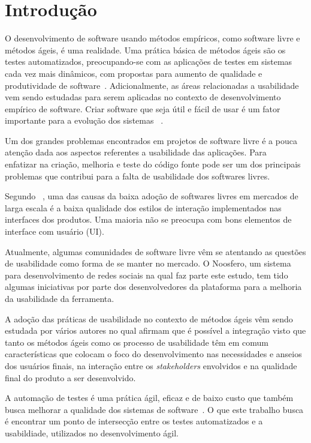 \chapter{Introdução}

O desenvolvimento de software usando métodos empíricos, como software livre e métodos ágeis, é uma realidade. Uma prática básica de métodos ágeis são os testes automatizados, preocupando-se com as aplicações de testes em sistemas cada vez mais dinâmicos, com propostas para aumento de qualidade e produtividade de software~\cite{vicente2010}.
%
Adicionalmente, as áreas relacionadas a usabilidade vem sendo estudadas para serem aplicadas no contexto de desenvolvimento empírico de software. Criar software que seja útil e fácil de usar é um fator importante para a evolução dos sistemas ~\cite{santos2012}.

Um dos grandes problemas encontrados em projetos de software livre é a pouca atenção dada aos aspectos referentes a usabilidade das aplicações. Para ~ enfatizar na criação, melhoria e teste do código fonte pode ser um dos principais problemas que contribui para a falta de usabilidade dos softwares livres.

%
Segundo ~, uma das causas da baixa adoção de softwares livres em mercados de larga escala é a baixa qualidade dos estilos de interação implementados nas interfaces dos produtos. Uma maioria não se preocupa com bons elementos de interface com usuário (UI). 

Atualmente, algumas comunidades de software livre vêm se atentando as questões de usabilidade como forma de se manter no mercado. 
%
O Noosfero, um sistema para desenvolvimento de redes sociais na qual faz parte este estudo, tem tido algumas iniciativas por parte dos desenvolvedores da plataforma para a melhoria da usabilidade da ferramenta. 

A adoção das práticas de usabilidade no contexto de métodos ágeis vêm sendo estudada por vários autores no qual afirmam que é possível a integração visto que tanto os métodos ágeis como os processo de usabilidade têm em comum características que colocam o foco do desenvolvimento nas necessidades e anseios dos usuários finais, na interação entre os \textit{stakeholders} envolvidos e na qualidade final do produto a ser desenvolvido.

A automação de testes é uma prática ágil, eficaz e de baixo custo que também busca melhorar a qualidade dos sistemas de software~\cite{cotter1995}. O que este trabalho busca é encontrar um ponto de intersecção entre os testes automatizados e a usabildiade, utilizados no desenvolvimento ágil.

